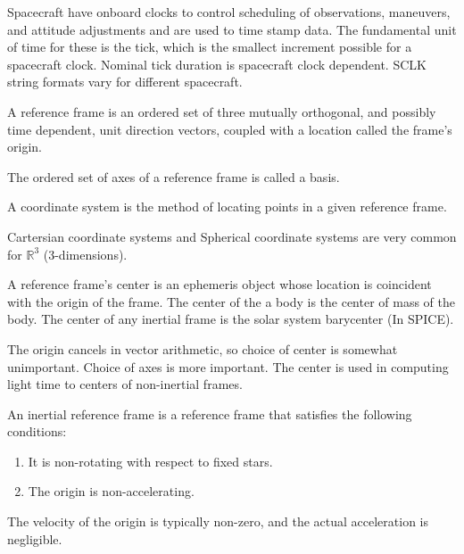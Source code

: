 \documentclass[crop=false,class=article,oneside]{standalone}
\begin{document}
            Spacecraft have onboard clocks to control scheduling of observations, maneuvers, and attitude adjustments and are used to time stamp data. The fundamental unit of time for these is the tick, which is the smallect increment possible for a spacecraft clock. Nominal tick duration is spacecraft clock dependent. SCLK string formats vary for different spacecraft. 
            \begin{definition}
            A reference frame is an ordered set of three mutually orthogonal, and possibly time dependent, unit direction vectors, coupled with a location called the frame's origin.
            \end{definition}
            \begin{definition}
            The ordered set of axes of a reference frame is called a basis.
            \end{definition}
            \begin{definition}
            A coordinate system is the method of locating points in a given reference frame.
            \end{definition}
            \begin{example}
            Cartersian coordinate systems and Spherical coordinate systems are very common for $\mathbb{R}^3$ (3-dimensions).
            \end{example}
            \begin{remark}
            A reference frame's center is an ephemeris object whose location is coincident with the origin of the frame. The center of the a body is the center of mass of the body. The center of any inertial frame is the solar system barycenter (In SPICE).
            \end{remark}
            The origin cancels in vector arithmetic, so choice of center is somewhat unimportant. Choice of axes is more important. The center is used in computing light time to centers of non-inertial frames.
            \begin{definition}
            An inertial reference frame is a reference frame that satisfies the following conditions:
            \begin{enumerate}
                \item It is non-rotating with respect to fixed stars.
                \item The origin is non-accelerating.
            \end{enumerate}
            \end{definition}
            \begin{remark}
            The velocity of the origin is typically non-zero, and the actual acceleration is negligible.
            \end{remark}
\end{document}
